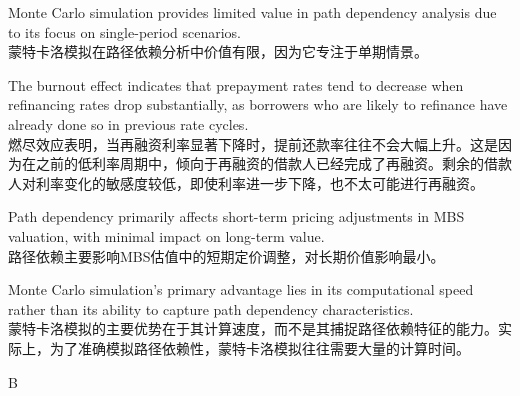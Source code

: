 \documentclass{article}
\begin{document}
\begin{choices}
    \item Monte Carlo simulation provides limited value in path dependency analysis due to its focus on single-period scenarios.\\
    蒙特卡洛模拟在路径依赖分析中价值有限，因为它专注于单期情景。
    \item The burnout effect indicates that prepayment rates tend to decrease when refinancing rates drop substantially, as borrowers who are likely to refinance have already done so in previous rate cycles.\\
    燃尽效应表明，当再融资利率显著下降时，提前还款率往往不会大幅上升。这是因为在之前的低利率周期中，倾向于再融资的借款人已经完成了再融资。剩余的借款人对利率变化的敏感度较低，即使利率进一步下降，也不太可能进行再融资。
    \item Path dependency primarily affects short-term pricing adjustments in MBS valuation, with minimal impact on long-term value.\\
    路径依赖主要影响MBS估值中的短期定价调整，对长期价值影响最小。
    \item Monte Carlo simulation's primary advantage lies in its computational speed rather than its ability to capture path dependency characteristics.\\
    蒙特卡洛模拟的主要优势在于其计算速度，而不是其捕捉路径依赖特征的能力。实际上，为了准确模拟路径依赖性，蒙特卡洛模拟往往需要大量的计算时间。
\end{choices}

\begin{correctanswer}
    B
\end{correctanswer}
\end{document}

